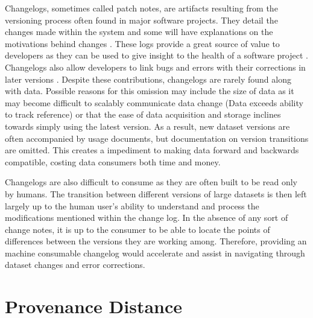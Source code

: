 Changelogs, sometimes called patch notes, are artifacts resulting from the versioning process often found in major software projects.
They detail the changes made within the system and some will have explanations on the motivations behind changes \cite{uel1037}.
These logs provide a great source of value to developers as they can be used to give insight to the health of a software project \cite{German03automatingthe} \cite{6132954}.
Changelogs also allow developers to link bugs and errors with their corrections in later versions \cite{Chen:2004:OCL:990374.990391}.
Despite these contributions, changelogs are rarely found along with data.
Possible reasons for this omission may include the size of data  as it may become difficult to scalably communicate data change (Data exceeds ability to track reference) or that the ease of data acquisition and storage inclines towards simply using the latest version.
As a result, new dataset versions are often accompanied by usage documents, but documentation on version transitions are omitted.
This creates a impediment to making data forward and backwards compatible, costing data consumers both time and money.

Changelogs are also difficult to consume as they are often built to be read only by humans.
The transition between different versions of large datasets is then left largely up to the human user's ability to understand and process the modifications mentioned within the change log.
In the absence of any sort of change notes, it is up to the consumer to be able to locate the points of differences between the versions they are working among.
Therefore, providing an machine consumable changelog would accelerate and assist in navigating through dataset changes and error corrections.

\section{Provenance Distance}

